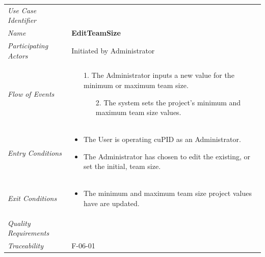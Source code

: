 \documentclass[12pt,letterpaper]{article}
\begin{document}
\begin{center}
	\begin{tabu} to 
		\toprule
		Use Case Identifier & \editteamsize{} \\
		Name & {\bf EditTeamSize} \\
		Participating Actors & Initiated by Administrator \\
		Flow of Events & 
		\begin{minipage}[t]{\linewidth}
		    \begin{enumerate}
			    \item[1.] The Administrator inputs a new value for the minimum or maximum team size.
			    \begin{enumerate}
			        \item[2.] The system sets the project's minimum and maximum team size values.
			    \end{enumerate}
			\end{enumerate}
		\end{minipage} \\

		Entry Conditions &
		\begin{minipage}[t]{\linewidth}
			\begin{itemize}
			    \item The User is operating cuPID as an Administrator.
			    \item The Administrator has chosen to edit the existing, or set the initial, team size.
	        \end{itemize}
		\end{minipage} \\

		Exit Conditions &
		\begin{minipage}[t]{\linewidth}
			\begin{itemize}
			    \item The minimum and maximum team size project values have are updated.
	        \end{itemize}
		\end{minipage} \\

		Quality Requirements & \\

		Traceability & F-06-01 \\
		\toprule
	\end{tabu}
\end{center}
\end{document}
